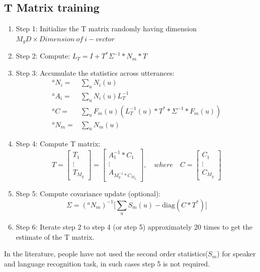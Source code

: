 \begin{spacing}{1.5}
\subsection{T Matrix training}
\begin{enumerate}
    \item Step 1: Initialize the T matrix randomly having dimension $M_{g}D \times Dimension~of~i-vector$
    \item Step 2: Compute: $L_{T}=I+T^{*}\Sigma^{-1}*N_{m}*T$
    \item Step 3: Accumulate the statistics across utterances:
    \begin{equation}
        \begin{aligned}
         ^{a}N_{i}=&\sum_{u}N_{i}(u)\\
         ^{a}A_{i}=&\sum_{u}N_{i}(u)L_{T}^{-1}\\
         ^{a}C=&\sum_{u}F_{m}(u)(L_{T}^{-1}(u)*T^{*}*\Sigma^{-1}*F_{m}(u))\\
         ^{a}N_{m}=&\sum_{u}N_{m}(u)
        \end{aligned}
    \end{equation}

    \item Step 4: Compute T matrix:
    \begin{equation}
        T=\begin{bmatrix}
        T_{1}\\
        \vdots\\
        T_{M_{g}}
        \end{bmatrix}=\begin{bmatrix}
        A_{1}^{-1}*C_{1}\\
        \vdots\\
        A_{M_{g}^{-1}*C_{M_{g}}}
        \end{bmatrix}, \quad where \quad C=\begin{bmatrix}
        C_{1}\\
        \vdots\\
        C_{M_{g}}
        \end{bmatrix}
    \end{equation}
    \item Step 5: Compute covariance update (optional):
    \begin{equation}
        \Sigma= (^{a}N_{m})^{-1}\Bigg[\sum_{u}S_{m}(u)-\mbox{diag}(C*T^{*})\Bigg]
    \end{equation}
    \item Step 6: Iterate step 2 to step 4 (or step 5) approximately 20 times to get the estimate of the T matrix.
\end{enumerate}
In the literature, people have not used the second order statistics($S_{m}$) for speaker and language recognition task, in such cases step 5 is not required.

\end{spacing}
